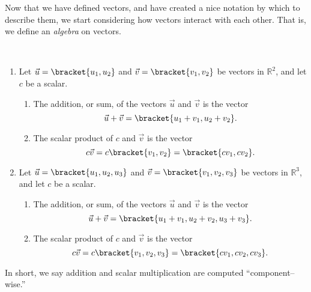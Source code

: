 Now that we have defined vectors, and have created a nice notation by which to describe them, we start considering how vectors interact with each other. That is, we define an \textit{algebra} on vectors.

{\mbox{}\\[-2\baselineskip]\begin{enumerate}
	\item Let $\vec u =\bracket{u_1,u_2}$ and $\vec v =\bracket{v_1,v_2}$ be vectors in $\mathbb{R}^2$, and let $c$ be a scalar. 
		\begin{enumerate}
			\item The addition, or sum, of the vectors $\vec u$ and $\vec v$ is the vector
			\[\vec u+\vec v =\bracket{u_1+v_1, u_2+v_2}.\]
			\item	The scalar product of $c$ and $\vec v$ is the vector 
			\[c\vec v = c\bracket{v_1,v_2}=\bracket{cv_1,cv_2}.\]
		\end{enumerate}
	\item Let $\vec u =\bracket{u_1,u_2,u_3}$ and $\vec v =\bracket{v_1,v_2,v_3}$ be vectors in $\mathbb{R}^3$, and let $c$ be a scalar. 
		\begin{enumerate}
			\item The addition, or sum, of the vectors $\vec u$ and $\vec v$ is the vector
			\[\vec u+\vec v =\bracket{u_1+v_1, u_2+v_2, u_3+v_3}.\]
			\item	The scalar product of $c$ and $\vec v$ is the vector 
			\[c\vec v = c\bracket{v_1,v_2,v_3}=\bracket{cv_1,cv_2,cv_3}.\]
		\end{enumerate}
\end{enumerate}}

In short, we say addition and scalar multiplication are computed ``component--wise.''

